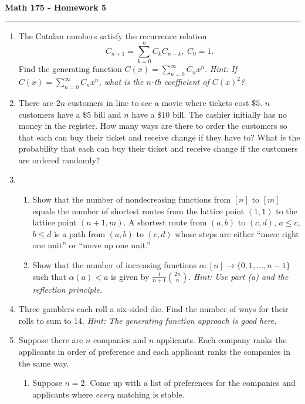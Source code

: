 \documentclass[11pt,letterpaper]{report}
\begin{document}
\begin{center}
{\bf \Large Math 175 - Homework 5}
\vspace{0.2cm}
\hrule
\end{center}

\begin{enumerate}
	\item The Catalan numbers satisfy the recurrence relation
	\[
	C_{n+1} = \sum_{k=0}^nC_kC_{n-k},\ C_0 = 1.
	\]
	Find the generating function $C(x) = \sum_{n=0}^\infty C_nx^n$. \textit{Hint: If $C(x) = \sum_{n=0}^\infty C_nx^n$, what is the $n$-th coefficient of $C(x)^2$?}

	\vfill

	\item There are $2n$ customers in line to see a movie where tickets cost $\$5$. $n$ customers have a $\$5$ bill and $n$ have a $\$10$ bill. The cashier initially has no money in the register. How many ways are there to order the customers so that each can buy their ticket and receive change if they have to? What is the probability that each can buy their ticket and receive change if the customers are ordered randomly?
	\vfill

	\item \begin{enumerate}
		\item Show that the number of nondecreasing functions from $[n]$ to $[m]$ equals the number of shortest routes from the lattice point $(1, 1)$ to the lattice point $(n+1, m)$. A shortest route from $(a,b)$ to $(c,d)$, $a\leq c$, $b\leq d$ is a path from $(a,b)$ to $(c,d)$ whose steps are either ``move right one unit'' or ``move up one unit.''
		\vfill
		\item Show that the number of increasing functions $\alpha: [n]\to \{0, 1, \ldots, n-1\}$ such that $\alpha(a)<a$ is given by $\frac{1}{n+1}\binom{2n}{n}$. \textit{Hint: Use part (a) and the reflection principle.}
		\vfill
	\end{enumerate}

	\item Three gamblers each roll a six-sided die. Find the number of ways for their rolls to sum to 14. \textit{Hint: The generating function approach is good here.}
	\vfill%


	\item Suppose there are $n$ companies and $n$ applicants. Each company ranks the applicants in order of preference and each applicant ranks the companies in the same way.
	\begin{enumerate}
		\item Suppose $n = 2$. Come up with a list of preferences for the companies and applicants where \textit{every} matching is stable.


\end{enumerate}
\end{enumerate}
\end{document}
